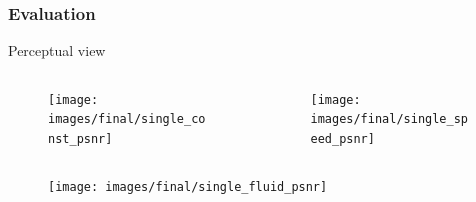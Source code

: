 \documentclass[18pt, xcolor=table]{beamer}
\begin{document}
\begin{frame}[t]
  \frametitle{Evaluation}
  \large{Perceptual view}
  \vspace{-0.5cm}
  \begin{columns}[t]
    \begin{column}{0.5\textwidth}
      \begin{center}
        \begin{figure}[htb]
          \texttt{[image: images/final/single\_const\_psnr]}
        \end{figure}
      \end{center}
    \end{column}
    \begin{column}{0.5\textwidth}
      \begin{center}
        \begin{figure}[htb]
          \texttt{[image: images/final/single\_speed\_psnr]}
        \end{figure}
      \end{center}
    \end{column}
  \end{columns}

  \begin{center}
    \begin{figure}[htb]
      \texttt{[image: images/final/single\_fluid\_psnr]}
    \end{figure}
  \end{center}

\end{frame}
\end{document}
